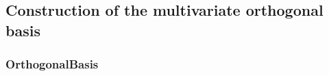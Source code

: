 \begin{description}
\begin{description}
\end{description}

\end{description}



\newpage
\subsection{Construction of the multivariate orthogonal basis}


\subsubsection{OrthogonalBasis}

